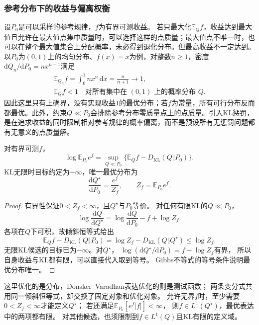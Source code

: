 \subsubsection{参考分布下的收益与偏离权衡}
\label{sec:information-gibbs-optimization}

设\(P_0\)是可以采样的参考规律，\(f\)为有界可测收益。
若只最大化\(\mathbb E_Qf\)，收益达到最大值且允许在最大值点集中质量时，可以选择这样的点质量；最大值点不唯一时，也可以在整个最大值集合上分配概率，未必得到退化分布。但最高收益不一定达到。以\(P_0\)为\((0,1)\)上的均匀分布、\(f(x)=x\)为例，对整数\(n\geq1\)，密度\(\mathrm dQ_n/\mathrm dP_0=nx^{n-1}\)满足
\[
 \begin{gathered}
 \mathbb E_{Q_n}f=\int_0^1 nx^n\,\mathrm dx=\frac{n}{n+1}\longrightarrow1,\\
 \mathbb E_Qf<1\quad\text{对所有集中在 }(0,1)\text{ 上的概率分布 }Q.
 \end{gathered}
\]
因此这里只有上确界，没有实现收益\(1\)的最优分布；若\(f\)为常量，所有可行分布反而都最优。此外，约束\(Q\ll P_0\)会排除参考分布零质量点上的点质量。引入KL惩罚，是在追求收益的同时限制相对参考规律的概率偏离，而不是预设所有无惩罚问题都有无意义的点质量解。
\begin{theorem}[Gibbs变分式]
\label{thm:information-gibbs-variational}
对有界可测\(f\)，
\begin{equation}
  \log\mathbb E_{P_0}e^f
  =\sup_{Q\ll P_0}\{\mathbb E_Qf-D_{\mathrm{KL}}(Q\Vert P_0)\}.
  \label{eq:information-gibbs-variational}
\end{equation}
KL无限时目标约定为\(-\infty\)，唯一最优分布为
\[
  \frac{\mathrm dQ^\star}{\mathrm dP_0}
  =\frac{e^f}{Z_f},\qquad Z_f=\mathbb E_{P_0}e^f.
\]
\end{theorem}
\begin{proof}
有界性保证\(0<Z_f<\infty\)，且\(Q^\star\)与\(P_0\)等价。
对任何有限KL的\(Q\ll P_0\)，
\[
  \log\frac{\mathrm dQ}{\mathrm dQ^\star}
  =\log\frac{\mathrm dQ}{\mathrm dP_0}-f+\log Z_f.
\]
各项在\(Q\)下可积，故倾斜恒等式给出
\[
  \mathbb E_Qf-D_{\mathrm{KL}}(Q\Vert P_0)
  =\log Z_f-D_{\mathrm{KL}}(Q\Vert Q^\star)\leq\log Z_f.
\]
无限KL候选的目标已为\(-\infty\)。对\(Q^\star\)，
\(\log(\mathrm dQ^\star/\mathrm dP_0)=f-\log Z_f\)有界，
所以自身收益与KL都有限，可以直接代入取到等号。
Gibbs不等式的等号条件说明最优分布唯一。
\end{proof}

这里优化的是分布，Donsker--Varadhan表达优化的则是测试函数；
两条变分式共用同一倾斜恒等式，却交换了固定对象和优化对象。
允许无界\(f\)时，至少需要\(0<Z_f<\infty\)才能定义\(Q^\star\)；
若还满足\(\mathbb E_{P_0}[e^f|f|]<\infty\)，
则\(f\in L^1(Q^\star)\)，最优表达中的两项都有限。
对其他候选，也须限制到\(f\in L^1(Q)\)且KL有限的定义域。

